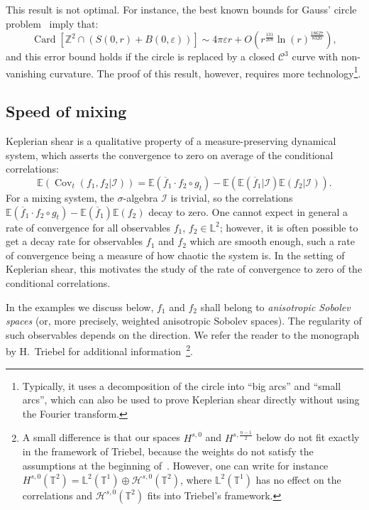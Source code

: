 \documentclass[AHL,Unicode,longabstracts]{cedram}
\DeclareMathOperator{\Card}{Card}
\DeclareMathOperator{\Cov}{Cov}
\newcommand{\Z}{\mathbb{Z}}
\newcommand{\Ebb}{\mathbb{E}}
\newcommand{\Lbb}{\mathbb{L}}
\newcommand{\Tbb}{\mathbb{T}}
\newcommand{\Ccal}{\mathcal{C}}
\newcommand{\Hcal}{\mathcal{H}}
\newcommand{\Ical}{\mathcal{I}}
\begin{document}

This result is not optimal. For instance, the best known bounds for Gauss' circle problem~\cite{Huxley:2003} imply that:
\[
\Card \left[\Z^2 \cap (S(0,r)+B(0,\varepsilon))\right]
\sim 4 \pi \varepsilon r + O (r^\frac{131}{208} \ln (r)^{\frac{18627}{8320}}),
\]
and this error bound holds if the circle is replaced by a closed $\Ccal^3$ curve with non-vanishing curvature. The proof of this result, however, requires more technology\footnote{Typically, it uses a decomposition of the circle into ``big arcs'' and ``small arcs'', which can also be used to prove Keplerian shear directly without using the Fourier transform.}.



\subsection{Speed of mixing}\label{subsec:Speed}

Keplerian shear is a qualitative property of a measure-preserving dynamical system, which asserts the convergence to zero on average of the conditional correlations:
\begin{equation}
\Ebb (\Cov_t (f_1, f_2|\Ical)) = \Ebb (\overline{f}_1 \cdot f_2 \circ g_t) - \Ebb(\Ebb(\overline{f}_1|\Ical) \Ebb(f_2|\Ical)).
\end{equation}
For a mixing system, the $\sigma$-algebra $\Ical$ is trivial, so the correlations $\Ebb (\overline{f}_1 \cdot f_2 \circ g_t) - \Ebb(\overline{f}_1) \Ebb(f_2)$ decay to zero. One cannot expect in general a rate of convergence for all observables $f_1$, $f_2 \in \Lbb^2$; however, it is often possible to get a decay rate for observables $f_1$ and $f_2$ which are smooth enough, such a rate of convergence being a measure of how chaotic the system is. In the setting of Keplerian shear, this motivates the study of the rate of convergence to zero of the conditional correlations.


In the examples we discuss below, $f_1$ and $f_2$ shall belong to
\emph{anisotropic Sobolev spaces} (or, more precisely, weighted anisotropic Sobolev spaces). The regularity of such observables depends on the direction. We refer the reader to the monograph by H.~Triebel for additional information~\cite[Chapters~5-6]{Triebel:2006}\footnote{A small difference is that our spaces $H^{s,0}$ and $H^{s,\frac{n-1}{2}}$ below do not fit exactly in the framework of Triebel, because the weights do not satisfy the assumptions at the beginning of~\cite[Chapters~6]{Triebel:2006}. However, one can write for instance $H^{s,0} (\Tbb^2) = \Lbb^2 (\Tbb^1) \oplus \Hcal^{s,0} (\Tbb^2)$, where $\Lbb^2 (\Tbb^1)$ has no effect on the correlations and $\Hcal^{s,0} (\Tbb^2)$ fits into Triebel's framework.}.
\end{document}
